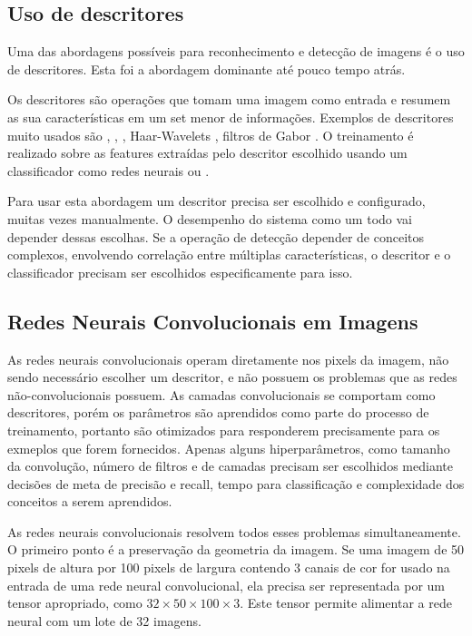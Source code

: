 \subsection{Uso de descritores}
Uma das abordagens possíveis para reconhecimento e detecção de imagens é o uso
de descritores. Esta foi a abordagem dominante até pouco tempo atrás.

Os descritores são operações que tomam uma imagem como entrada e resumem as sua
características em um set menor de informações. Exemplos de descritores muito
usados são
	\cite{wang1990texture},
 \cite{rublee2011orb},
 \cite{dalal2005histograms},
Haar-Wavelets \cite{nabout2008object},
filtros de Gabor \cite{riaz2012invariant}.
O treinamento é realizado sobre
as features extraídas pelo descritor escolhido usando um classificador como
redes neurais ou .

Para usar esta abordagem um descritor precisa ser escolhido e configurado,
muitas vezes manualmente. O desempenho do sistema como um todo vai depender
dessas escolhas. Se a operação de detecção depender de conceitos complexos,
envolvendo correlação entre múltiplas características, o descritor e o
classificador precisam ser escolhidos especificamente para isso.

\subsection{Redes Neurais Convolucionais em Imagens}
As redes neurais convolucionais operam diretamente nos pixels da imagem, não
sendo necessário escolher um descritor, e não possuem os problemas que as
redes não-convolucionais possuem. As camadas convolucionais se comportam como
descritores, porém os parâmetros são aprendidos como parte do processo de
treinamento, portanto são otimizados para responderem precisamente para os
exmeplos que forem fornecidos. Apenas alguns hiperparâmetros, como tamanho
da convolução, número de filtros e de camadas precisam ser escolhidos mediante
decisões de meta de precisão e recall, tempo para classificação e complexidade
dos conceitos a serem aprendidos.

As redes neurais convolucionais resolvem todos esses problemas simultaneamente.
O primeiro ponto é a preservação da geometria da imagem. Se uma imagem de 50
pixels de altura por 100 pixels de largura contendo 3 canais de cor for usado na
entrada de uma rede neural convolucional, ela precisa ser representada por um
tensor apropriado, como $32 \times 50 \times 100 \times 3$. Este tensor
permite alimentar a rede neural com um lote de 32 imagens.

